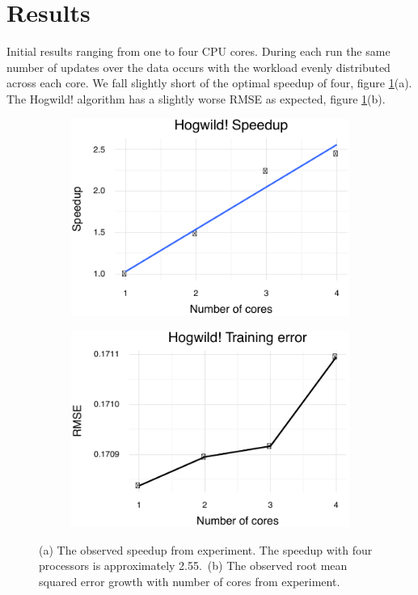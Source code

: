 \documentclass{article} %
\begin{document}
\section{Results}
Initial results ranging from one to four CPU cores. During each run the same number of updates over the data occurs with the workload evenly distributed across each core. We fall slightly short of the optimal speedup of four, figure \ref{res}(a). The Hogwild! algorithm has a slightly worse RMSE as expected, figure \ref{res}(b).
\begin{figure}[htb]
\centering
\begin{subfigure}{0.49\textwidth}
\includegraphics[width=\textwidth]{./speedup.pdf}
\end{subfigure}
\centering
\begin{subfigure}{0.49\textwidth}
\includegraphics[width=\textwidth]{./error.pdf}
\end{subfigure}
\caption{(a) The observed speedup from experiment. The speedup with four processors is approximately 2.55.~(b) The observed root mean squared error growth with number of cores from experiment.}
\label{res}
\end{figure}
\end{document}
